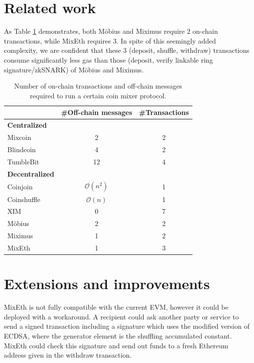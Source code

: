 \documentclass[a4paper]{article}
\theoremstyle{definition}
\begin{document}
\section{Related work}
As Table \ref{table:communicationcomplexity} demonstrates, both Möbius and Miximus require $2$ on-chain transactions, while MixEth requires $3$. In spite of this seemingly added complexity, we are confident that these 3 (deposit, shuffle, withdraw) transactions consume significantly less gas than those (deposit, verify linkable ring signature/zkSNARK) of Möbius and Miximus. 
\begin{table}[H] 
\caption{Number of on-chain transactions and off-chain messages required to run a certain coin mixer protocol.}
\centering 
\begin{tabular}{lcc} 
	
	\toprule
	&\#Off-chain messages& \#Transactions \\
	\midrule
	\textbf{Centralized} & & \\
	\midrule
	Mixcoin \cite{bonneau2014mixcoin} & 2      & 2       \\
	Blindcoin \cite{valenta2015blindcoin} & 4      & 2       \\
	TumbleBit \cite{heilman2017tumblebit} & 12      & 4      \\
	\midrule
	\textbf{Decentralized}      &    &      \\
	\midrule
	Coinjoin \cite{maxwell2013coinjoin} &  $\mathcal{O}(n^2)$     & 1       \\
	Coinshuffle \cite{ruffing2014coinshuffle} &$\mathcal{O}(n)$       & 1       \\
	XIM \cite{bissias2014sybil} & 0      & 7       \\
	Möbius \cite{meiklejohn2018mobius} & 2    & 2       \\
	Miximus \cite{miximus2018} & 1 & 2 \\
	MixEth & 1 & 3 \\
	\bottomrule
\end{tabular}
\label{table:communicationcomplexity}
\end{table}

\section{Extensions and improvements}
MixEth is not fully compatible with the current EVM, however it could be deployed with a workaround. A recipient could ask another party or service to send a signed transaction including a signature which uses the modified version of ECDSA, where the generator element is the shuffling accumulated constant. MixEth could check this signature and send out funds to a fresh Ethereum address given in the withdraw transaction. 
 
\end{document}
